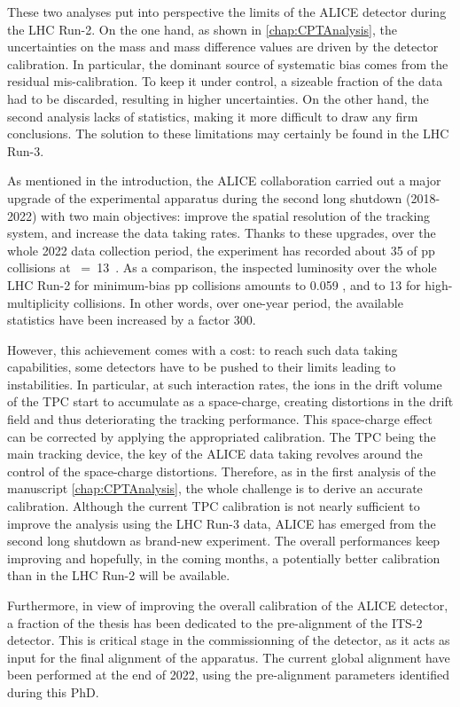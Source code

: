 These two analyses put into perspective the limits of the ALICE detector during the LHC Run-2. On the one hand, as shown in \chap\ref{chap:CPTAnalysis}, the uncertainties on the mass and mass difference values are driven by the detector calibration. In particular, the dominant source of systematic bias comes from the residual mis-calibration. To keep it under control, a sizeable fraction of the data had to be discarded, resulting in higher uncertainties. On the other hand, the second analysis lacks of statistics, making it more difficult to draw any firm conclusions. The solution to these limitations may certainly be found in the LHC Run-3.


As mentioned in the introduction, the ALICE collaboration carried out a major upgrade of the experimental apparatus during the second long shutdown (2018-2022) with two main objectives: improve the spatial resolution of the tracking system, and increase the data taking rates. Thanks to these upgrades, over the whole 2022 data collection period, the experiment has recorded about 35 \invpb of pp collisions at \sqrtS~=~13~\tev \cite{cern152ndLHCCMeeting2022}. As a comparison, the inspected luminosity over the whole LHC Run-2 for minimum-bias pp collisions amounts to 0.059 \invpb, and to 13 \invpb for high-multiplicity collisions. In other words, over one-year period, the available statistics have been increased by a factor 300.

However, this achievement comes with a cost: to reach such data taking capabilities, some detectors have to be pushed to their limits leading to instabilities. In particular, at such interaction rates, the ions in the drift volume of the TPC start to accumulate as a space-charge, creating distortions in the drift field and thus deteriorating the tracking performance. This space-charge effect can be corrected by applying the appropriated calibration. The TPC being the main tracking device, the key of the ALICE data taking revolves around the control of the space-charge distortions. Therefore, as in the first analysis of the manuscript \chap\ref{chap:CPTAnalysis}, the whole challenge is to derive an accurate calibration. Although the current TPC calibration is not nearly sufficient to improve the analysis using the LHC Run-3 data, ALICE has emerged from the second long shutdown as brand-new experiment. The overall performances keep improving and hopefully, in the coming months, a potentially better calibration than in the LHC Run-2 will be available.

Furthermore, in view of improving the overall calibration of the ALICE detector, a fraction of the thesis has been dedicated to the pre-alignment of the ITS-2 detector. This is critical stage in the commissionning of the detector, as it acts as input for the final alignment of the apparatus. The current global alignment have been performed at the end of 2022, using the pre-alignment parameters identified during this PhD.

